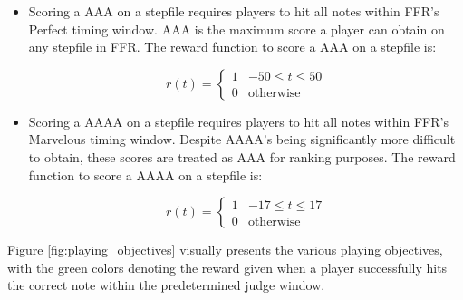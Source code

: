 \begin{itemize}
    \item Scoring a AAA on a stepfile requires players to hit all notes within FFR's Perfect timing window. AAA is the maximum score a player can obtain on any stepfile in FFR. The reward function to score a AAA on a stepfile is:

    $$r(t) = \begin{cases} 
          1 & -50 \leq t \leq 50 \\
          0 & \text{otherwise}
       \end{cases}$$

    \item Scoring a AAAA on a stepfile requires players to hit all notes within FFR's Marvelous timing window. Despite AAAA's being significantly more difficult to obtain, these scores are treated as AAA for ranking purposes. The reward function to score a AAAA on a stepfile is:

    $$r(t) = \begin{cases} 
          1 & -17 \leq t \leq 17 \\
          0 & \text{otherwise}
       \end{cases}$$
\end{itemize}

Figure \ref{fig:playing_objectives} visually presents the various playing objectives, with the green colors denoting the reward given when a player successfully hits the correct note within the predetermined judge window.  

